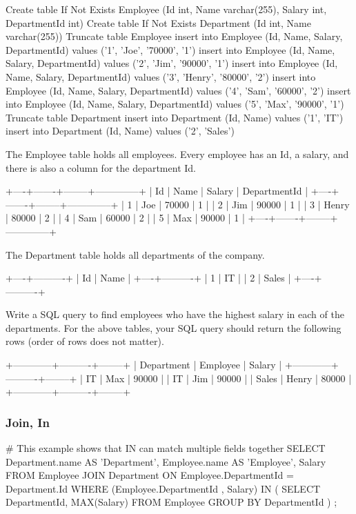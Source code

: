 \begin{Code}
Create table If Not Exists Employee (Id int, Name varchar(255), Salary int, DepartmentId int)
Create table If Not Exists Department (Id int, Name varchar(255))
Truncate table Employee
insert into Employee (Id, Name, Salary, DepartmentId) values ('1', 'Joe', '70000', '1')
insert into Employee (Id, Name, Salary, DepartmentId) values ('2', 'Jim', '90000', '1')
insert into Employee (Id, Name, Salary, DepartmentId) values ('3', 'Henry', '80000', '2')
insert into Employee (Id, Name, Salary, DepartmentId) values ('4', 'Sam', '60000', '2')
insert into Employee (Id, Name, Salary, DepartmentId) values ('5', 'Max', '90000', '1')
Truncate table Department
insert into Department (Id, Name) values ('1', 'IT')
insert into Department (Id, Name) values ('2', 'Sales')
\end{Code}

The Employee table holds all employees. Every employee has an Id, a salary, and there is also a column for the department Id.

\begin{Code}
+----+-------+--------+--------------+
| Id | Name  | Salary | DepartmentId |
+----+-------+--------+--------------+
| 1  | Joe   | 70000  | 1            |
| 2  | Jim   | 90000  | 1            |
| 3  | Henry | 80000  | 2            |
| 4  | Sam   | 60000  | 2            |
| 5  | Max   | 90000  | 1            |
+----+-------+--------+--------------+
\end{Code}

The Department table holds all departments of the company.
\begin{Code}
+----+----------+
| Id | Name     |
+----+----------+
| 1  | IT       |
| 2  | Sales    |
+----+----------+
\end{Code}

Write a SQL query to find employees who have the highest salary in each of the departments. For the above tables, your SQL query should return the following rows (order of rows does not matter).
\begin{Code}
+------------+----------+--------+
| Department | Employee | Salary |
+------------+----------+--------+
| IT         | Max      | 90000  |
| IT         | Jim      | 90000  |
| Sales      | Henry    | 80000  |
+------------+----------+--------+
\end{Code}

\subsubsection{Join, In}
\begin{Code}
# This example shows that IN can match multiple fields together
SELECT
    Department.name AS 'Department',
    Employee.name AS 'Employee',
    Salary
FROM
    Employee
        JOIN
    Department ON Employee.DepartmentId = Department.Id
WHERE
    (Employee.DepartmentId , Salary) IN
    (   SELECT
            DepartmentId, MAX(Salary)
        FROM
            Employee
        GROUP BY DepartmentId
    )
;
\end{Code}

